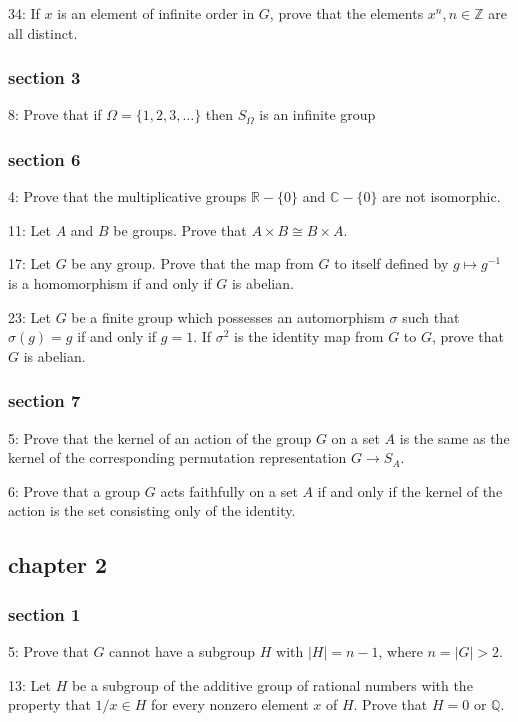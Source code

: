 \documentclass{article}
\begin{document}
34: If $x$ is an element of infinite order in $G$, prove that the elements $x^{n}, n \in \mathbb{Z}$ are all distinct.

\subsubsection*{section 3}
8: Prove that if $\Omega=\{1,2,3, \ldots\}$ then $S_{\Omega}$ is an infinite group

\subsubsection*{section 6}
4: Prove that the multiplicative groups $\mathbb{R}-\{0\}$ and $\mathbb{C}-\{0\}$ are not isomorphic.

11: Let $A$ and $B$ be groups. Prove that $A \times B \cong B \times A$.

17: Let $G$ be any group. Prove that the map from $G$ to itself defined by $g \mapsto g^{-1}$ is a homomorphism if and only if $G$ is abelian.

23: Let $G$ be a finite group which possesses an automorphism $\sigma$ such that $\sigma(g)=g$ if and only if $g=1$. If $\sigma^{2}$ is the identity map from $G$ to $G$, prove that $G$ is abelian. 

\subsubsection*{section 7}
5: Prove that the kernel of an action of the group $G$ on a set $A$ is the same as the kernel of the corresponding permutation representation $G\to S_A$. 

6: Prove that a group $G$ acts faithfully on a set $A$ if and only if the kernel of the action is the set consisting only of the identity. 

\subsection*{chapter 2}
\subsubsection*{section 1}
5: Prove that $G$ cannot have a subgroup $H$ with $|H|=n-1$, where $n=|G|>2$.

13: Let $H$ be a subgroup of the additive group of rational numbers with the property that $1 / x \in H$ for every nonzero element $x$ of $H$. Prove that $H=0$ or $\mathbb{Q}$.
\end{document}
